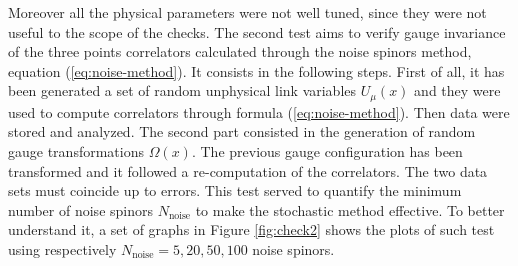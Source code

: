 \documentclass[english, LaM, oneside, noexaminfo]{sapthesis}
\begin{document}
Moreover all the physical parameters were not well tuned, since they were not useful to the scope of the checks. 
\newline
The second test aims to verify gauge invariance of the three points correlators calculated through the noise spinors method, equation (\ref{eq:noise-method}).
It consists in the following steps.
First of all, it has been generated a set of random unphysical link variables $U_\mu (x)$ and they were used to compute correlators through formula (\ref{eq:noise-method}).
Then data were stored and analyzed.
The second part consisted in the generation of random gauge transformations $\Omega (x)$.
The previous gauge configuration has been transformed and it followed a re-computation of the correlators.
The two data sets must coincide up to errors.
This test served to quantify the minimum number of noise spinors $N_\text{noise}$ to make the stochastic method effective.
To better understand it, a set of graphs in Figure \ref{fig:check2} shows the plots of such test using respectively $N_\text{noise} = 5,20,50,100$ noise spinors.
\end{document}
